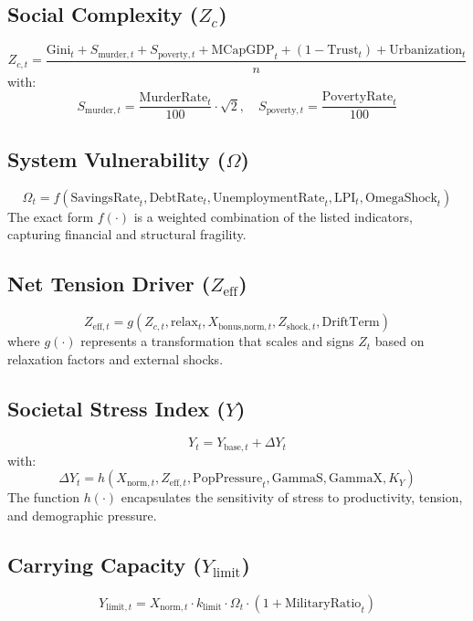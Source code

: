 \documentclass[12pt,a4paper]{article}
\begin{document}
\subsection{Social Complexity ($Z_c$)}
\begin{equation}
Z_{c,t} = \frac{\text{Gini}_t + S_{\text{murder},t} + S_{\text{poverty},t} + \text{MCapGDP}_t + (1 - \text{Trust}_t) + \text{Urbanization}_t}{n}
\end{equation}
with:
\[
S_{\text{murder},t} = \frac{\text{MurderRate}_t}{100} \cdot \sqrt{2}, \quad
S_{\text{poverty},t} = \frac{\text{PovertyRate}_t}{100}
\]

\subsection{System Vulnerability ($\Omega$)}
\begin{equation}
\Omega_t = f(\text{SavingsRate}_t, \text{DebtRate}_t, \text{UnemploymentRate}_t, \text{LPI}_t, \text{OmegaShock}_t)
\end{equation}
The exact form $f(\cdot)$ is a weighted combination of the listed indicators, capturing financial and structural fragility.

\subsection{Net Tension Driver ($Z_{\mathrm{eff}}$)}
\begin{equation}
Z_{\mathrm{eff},t} = g(Z_{c,t}, \text{relax}_t, X_{\text{bonus,norm},t}, Z_{\text{shock},t}, \text{DriftTerm})
\end{equation}
where $g(\cdot)$ represents a transformation that scales and signs $Z_t$ based on relaxation factors and external shocks.

\subsection{Societal Stress Index ($Y$)}
\begin{equation}
Y_t = Y_{\text{base},t} + \Delta Y_t
\end{equation}
with:
\[
\Delta Y_t = h(X_{\text{norm},t}, Z_{\mathrm{eff},t}, \text{PopPressure}_t, \text{GammaS}, \text{GammaX}, K_Y)
\]
The function $h(\cdot)$ encapsulates the sensitivity of stress to productivity, tension, and demographic pressure.

\subsection{Carrying Capacity ($Y_{\mathrm{limit}}$)}
\begin{equation}
Y_{\mathrm{limit},t} = X_{\text{norm},t} \cdot k_{\mathrm{limit}} \cdot \Omega_t \cdot (1 + \text{MilitaryRatio}_t)
\end{equation}
\end{document}
